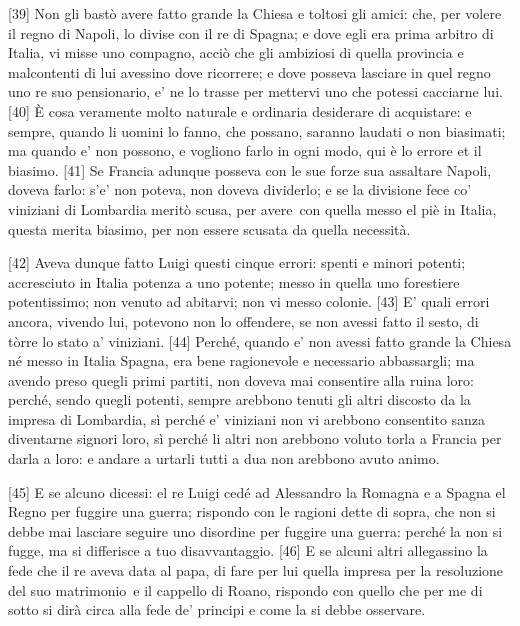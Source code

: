 {[}39{]} Non gli bastò avere fatto grande la Chiesa e toltosi gli amici:
che, per volere il regno di Napoli, lo divise con il re di Spagna; e
dove egli era prima arbitro di Italia, vi misse uno compagno, acciò che
gli ambiziosi di quella provincia e malcontenti di lui avessino dove
ricorrere; e dove posseva lasciare in quel regno uno re suo pensionario,
e' ne lo trasse per mettervi uno che potessi cacciarne lui. {[}40{]} È
cosa veramente molto naturale e ordinaria desiderare di acquistare: e
sempre, quando li uomini lo fanno, che possano, saranno laudati o non
biasimati; ma quando e' non possono, e vogliono farlo in ogni modo, qui
è lo errore et il biasimo. {[}41{]} Se Francia adunque posseva con le
sue forze sua assaltare Napoli, doveva farlo: s'e' non poteva, non
doveva dividerlo; e se la divisione fece co' viniziani di Lombardia
meritò scusa, per avere\est\ con quella messo el piè in Italia, questa merita
biasimo, per non essere scusata da quella necessità.

{[}42{]} Aveva dunque fatto Luigi questi cinque errori: spenti e minori
potenti; accresciuto in Italia potenza a uno potente; messo in quella
uno forestiere potentissimo; non venuto ad abitarvi; non vi messo
colonie. {[}43{]} E' quali errori ancora, vivendo lui, potevono non lo
offendere, se non avessi fatto il sesto, di tòrre lo stato a' viniziani. {[}44{]} Perché, quando e' non avessi fatto grande la Chiesa né messo in
Italia Spagna, era bene ragionevole e necessario abbassargli; ma avendo
preso quegli primi partiti, non doveva mai consentire alla ruina loro:
perché, sendo quegli potenti, sempre arebbono tenuti gli altri discosto
da la impresa di Lombardia, sì perché e' viniziani non vi arebbono
consentito sanza diventarne signori loro, sì perché li altri non
arebbono voluto torla a Francia per darla a loro: e andare a urtarli
tutti a dua non arebbono avuto animo.

{[}45{]} E se alcuno dicessi: el re Luigi cedé ad Alessandro la Romagna
e a Spagna el Regno per fuggire una guerra; rispondo con le ragioni
dette di sopra, che non si debbe mai lasciare seguire uno disordine per
fuggire una guerra: perché la non si fugge, ma si differisce a tuo
disavvantaggio. {[}46{]} E se alcuni altri allegassino la fede che il re
aveva data al papa, di fare per lui quella impresa per la resoluzione
del suo matrimonio\est\ e il cappello di Roano, rispondo con quello che per
me di sotto si dirà circa alla fede de' principi e come la si debbe
osservare.

